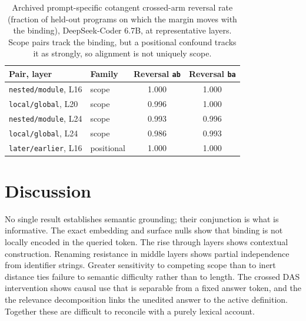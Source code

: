\documentclass[10pt]{article}
\newcommand{\code}[1]{\texttt{#1}}
\begin{document}
\begin{table}[t]
\centering
\small
\caption{Archived prompt-specific cotangent crossed-arm reversal rate (fraction of held-out programs on which
the margin moves with the binding), DeepSeek-Coder 6.7B, at representative
layers. Scope pairs track the binding, but a positional confound tracks it as
strongly, so alignment is not uniquely scope.}
\label{tab:jlens}
\begin{tabular}{@{}llcc@{}}
\toprule
Pair, layer & Family & Reversal \code{ab} & Reversal \code{ba} \\
\midrule
\code{nested/module}, L16   & scope      & 1.000 & 1.000 \\
\code{local/global}, L20    & scope      & 0.996 & 1.000 \\
\code{nested/module}, L24   & scope      & 0.993 & 0.996 \\
\code{local/global}, L24    & scope      & 0.986 & 0.993 \\
\code{later/earlier}, L16   & positional & 1.000 & 1.000 \\
\bottomrule
\end{tabular}
\end{table}

\section{Discussion}
\label{sec:discussion}
No single result establishes semantic grounding; their conjunction is what is
informative. The exact embedding and surface nulls show that binding is not
locally encoded in the queried token. The rise through layers shows contextual
construction. Renaming resistance in middle layers shows partial independence from
identifier strings. Greater sensitivity to competing scope than to inert distance
ties failure to semantic difficulty rather than to length. The crossed DAS
intervention shows causal use that is separable from a fixed answer token, and the
the relevance decomposition links the unedited answer to the active definition. Together these are
difficult to reconcile with a purely lexical account.
\end{document}
